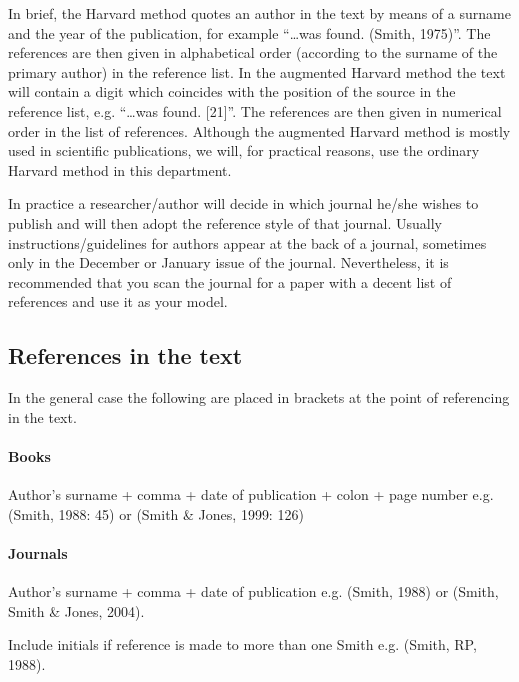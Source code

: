 \documentclass[a5paper, 10pt]{article}
\begin{document}
In brief, the Harvard method quotes an author in the text by means of
a surname and the year of the publication, for example ``\dots was found.
(Smith, 1975)''.  The references are then given in alphabetical order
(according to the surname of the primary author) in the reference
list.  In the augmented Harvard method the text will contain a digit
which coincides with the position of the source in the reference list,
e.g. ``\dots was found.  [21]''.  The references are then given in
numerical order in the list of references.  Although the augmented
Harvard method is mostly used in scientific publications, we will, for
practical reasons, use the ordinary Harvard method in this department.

In practice a researcher/author will decide in which journal he/she
wishes to publish and will then adopt the reference style of that
journal.  Usually instructions/guidelines for authors appear at the
back of a journal, sometimes only in the December or January issue of
the journal.  Nevertheless, it is recommended that you scan the
journal for a paper with a decent list of references and use it as
your model.

\subsection{References in the text}

In the general case the following are placed in brackets at the point
of referencing in the text.

\paragraph{Books} Author's surname + comma + date of publication + colon +
page number e.g. (Smith, 1988: 45) or (Smith \& Jones, 1999: 126)

\paragraph{Journals} Author's surname + comma + date of publication e.g.
(Smith, 1988) or (Smith, Smith \& Jones, 2004).

Include initials if reference is made to more than one Smith e.g.
(Smith, RP, 1988).
\end{document}
